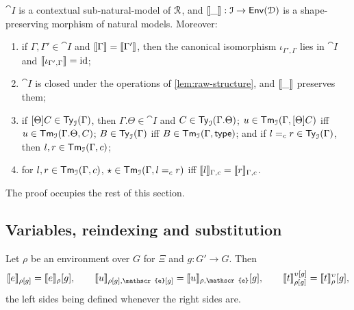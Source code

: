 \begin{proposition}\label{prop:interpretation-morphism}
    $\cat{I}$ is a contextual sub-natural-model of $\mathcal{R}$, and $\llbracket\_\rrbracket : \mathcal{I} \to \mathsf{Env}(\mathcal{D})$ is a shape-preserving morphism of natural models. Moreover:
    \begin{enumerate}
        \item if $\Gamma, \Gamma' \in \cat{I}$ and $\llbracket\Gamma\rrbracket = \llbracket\Gamma'\rrbracket$, then the canonical isomorphism $\iota_{\Gamma', \Gamma}$ lies in $\cat{I}$ and $\llbracket\iota_{\Gamma', \Gamma}\rrbracket = \mathrm{id}$;
        \item $\cat{I}$ is closed under the operations of \cref{lem:raw-structure}, and $\llbracket\_\rrbracket$ preserves them;
        \item if $[\Theta]C \in \mathsf{Ty}_{\mathcal{I}}(\Gamma)$, then $\Gamma.\Theta \in \cat{I}$ and $C \in \mathsf{Ty}_{\mathcal{I}}(\Gamma.\Theta)$; $u \in \mathsf{Tm}_{\mathcal{I}}(\Gamma, [\Theta]C)$ iff $u \in \mathsf{Tm}_{\mathcal{I}}(\Gamma.\Theta, C)$; $B \in \mathsf{Ty}_{\mathcal{I}}(\Gamma)$ iff $B \in \mathsf{Tm}_{\mathcal{I}}(\Gamma, \mathsf{type})$; and if $l =_c r \in \mathsf{Ty}_{\mathcal{I}}(\Gamma)$, then $l, r \in \mathsf{Tm}_{\mathcal{I}}(\Gamma, c)$;
        \item for $l, r \in \mathsf{Tm}_{\mathcal{I}}(\Gamma, c)$, $\star \in \mathsf{Tm}_{\mathcal{I}}(\Gamma, l =_c r)$ iff $\llbracket l\rrbracket_{\Gamma, c} = \llbracket r\rrbracket_{\Gamma, c}$.
    \end{enumerate}
\end{proposition}

The proof occupies the rest of this section.

\subsection{Variables, reindexing and substitution}
\label{sec:variables-substitution}

\begin{lemma}[Reindexing]\label{lem:interpretation-reindexing}
    Let $\rho$ be an environment over $G$ for $\Xi$ and $g : G' \to G$. Then
    \[
        \sem{e}_{\rho[g]} = \sem{e}_\rho[g], \qquad \sem{u}_{\rho[g], \mathscr{e}[g]} = \sem{u}_{\rho, \mathscr{e}}[g], \qquad \sem{t}^{\upsilon[g]}_{\rho[g]} = \sem{t}^{\upsilon}_\rho[g],
    \]
    the left sides being defined whenever the right sides are.
\end{lemma}

